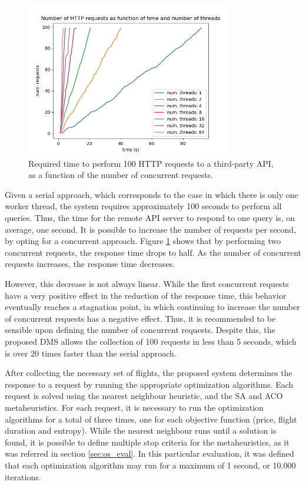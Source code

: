 \begin{figure}[h]
  \centering
  \includegraphics[width=9cm]{./Figures/results/dms_factory.png}
  \caption{Required time to perform 100 HTTP requests to a third-party API, as a function of the number of concurrent requests.}
  \label{fig:dms_factory}  
\end{figure}

Given a serial approach, which corresponds to the case in which there is only one worker thread, the system requires approximately 100 seconds to perform all queries. Thus, the time for the remote API server to respond to one query is, on average, one second. It is possible to increase the number of requests per second, by opting for a concurrent approach. Figure \ref{fig:dms_factory} shows that by performing two concurrent requests, the response time drops to half. As the number of concurrent requests increases, the response time decreases. 

However, this decrease is not always linear. While the first concurrent requests have a very positive effect in the reduction of the response time, this behavior eventually reaches a stagnation point, in which continuing to increase the number of concurrent requests has a negative effect. Thus, it is recommended to be sensible upon defining the number of concurrent requests. Despite this, the proposed DMS allows the collection of 100 requests in less than 5 seconds, which is over 20 times faster than the serial approach.

After collecting the necessary set of flights, the proposed system determines the response to a request by running the appropriate optimization algorithms. Each request is solved using the nearest neighbour heuristic, and the SA and ACO metaheuristics. For each request, it is necessary to run the optimization algorithms for a total of three times, one for each objective function (price, flight duration and entropy). While the nearest neighbour runs until a solution is found, it is possible to define multiple stop criteria for the metaheuristics, as it was referred in section \ref{sec:os_eval}. In this particular evaluation, it was defined that each optimization algorithm may run for a maximum of 1 second, or 10.000 iterations.


